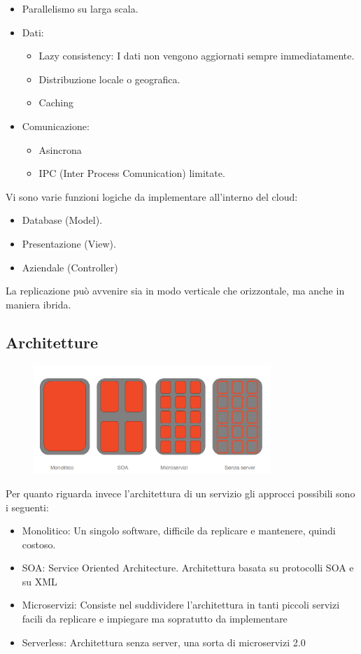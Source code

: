 \documentclass{article}
\begin{document}
		\begin{itemize}
		    \item Parallelismo su larga scala.
		    \item Dati:
		    \begin{itemize}
		        \item Lazy consistency: I dati non vengono aggiornati sempre immediatamente.
		        \item Distribuzione locale o geografica.
		        \item Caching
		    \end{itemize}
		    \item Comunicazione:
		    \begin{itemize}
		        \item Asincrona
		        \item IPC (Inter Process Comunication) limitate.
		    \end{itemize}
		\end{itemize}
		
		Vi sono varie funzioni logiche da implementare all'interno del cloud:
		\begin{itemize}
		    \item Database (Model).
		    \item Presentazione (View).
		    \item Aziendale (Controller)
		\end{itemize}
		La replicazione può avvenire sia in modo verticale che orizzontale, ma anche in maniera ibrida. 
		
		\subsection{Architetture}
		\begin{figure}[ht]
			\centering
			\includegraphics[width=0.8\textwidth]{SAC_A2_architecture_server.png}
		\end{figure}
		
		Per quanto riguarda invece l'architettura di un servizio gli approcci possibili sono i seguenti:
		\begin{itemize}
		    \item Monolitico: Un singolo software, difficile da replicare e mantenere, quindi costoso. 
		    \item SOA: Service Oriented Architecture. Architettura basata su protocolli SOA e su XML
		    \item Microservizi: Consiste nel suddividere l'architettura in tanti piccoli servizi facili da replicare e impiegare ma sopratutto da implementare
		    \item Serverless: Architettura senza server, una sorta di microservizi 2.0
		\end{itemize}
		
\end{document}
